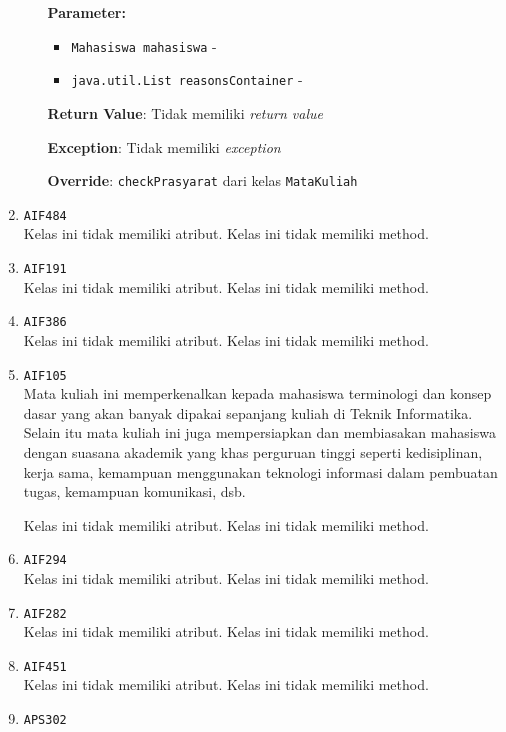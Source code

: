 \documentclass{article}
\begin{document}
\begin{enumerate}
\begin{itemize}
\textbf{Parameter:}\begin{itemize}
\item \texttt{Mahasiswa mahasiswa} - 
\item \texttt{java.util.List reasonsContainer} - 
\end{itemize}
\textbf{Return Value}: Tidak memiliki \textit{return value}

\textbf{Exception}: Tidak memiliki \textit{exception}

\textbf{Override}: \texttt{checkPrasyarat} dari kelas \texttt{MataKuliah}

\end{itemize}
\item \texttt{AIF484}\\ 


Kelas ini tidak memiliki atribut. Kelas ini tidak memiliki method. \item \texttt{AIF191}\\ 


Kelas ini tidak memiliki atribut. Kelas ini tidak memiliki method. \item \texttt{AIF386}\\ 


Kelas ini tidak memiliki atribut. Kelas ini tidak memiliki method. \item \texttt{AIF105}\\ 
Mata kuliah ini memperkenalkan kepada mahasiswa terminologi dan konsep dasar 
 yang akan banyak dipakai sepanjang kuliah di Teknik Informatika. Selain itu 
 mata kuliah ini juga mempersiapkan dan membiasakan mahasiswa dengan suasana 
 akademik yang khas perguruan tinggi seperti kedisiplinan, kerja sama, 
 kemampuan menggunakan teknologi informasi dalam pembuatan tugas, kemampuan 
 komunikasi, dsb.

Kelas ini tidak memiliki atribut. Kelas ini tidak memiliki method. \item \texttt{AIF294}\\ 


Kelas ini tidak memiliki atribut. Kelas ini tidak memiliki method. \item \texttt{AIF282}\\ 


Kelas ini tidak memiliki atribut. Kelas ini tidak memiliki method. \item \texttt{AIF451}\\ 


Kelas ini tidak memiliki atribut. Kelas ini tidak memiliki method. \item \texttt{APS302}\\ 



\end{enumerate}
\end{document}
